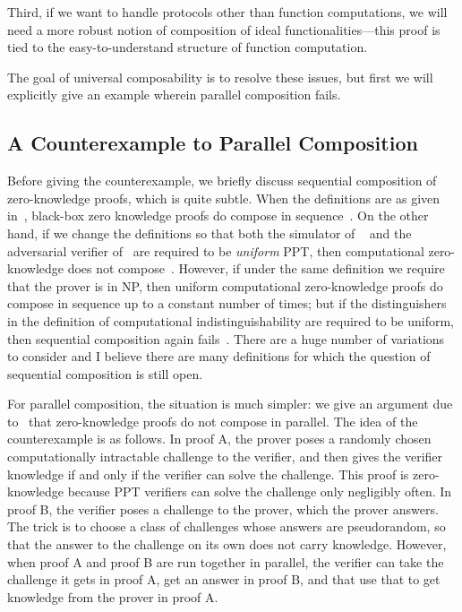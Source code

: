 Third, if we want to handle protocols other than function computations, we will
need a more robust notion of composition of ideal functionalities---this proof
is tied to the easy-to-understand structure of function computation.

The goal of universal composability is to resolve these issues, but first we
will explicitly give an example wherein parallel composition fails.

\subsection{A Counterexample to Parallel Composition}
\label{sec:no-parallel-zk}

Before giving the counterexample, we briefly discuss sequential composition of
zero-knowledge proofs, which is quite subtle. When the definitions are as given
in~, black-box zero
knowledge proofs do compose in sequence~\cite{goldreich-1994}. On the other
hand, if we change the definitions so that both the simulator of
~ and the
adversarial verifier of~
are required to be \emph{uniform} PPT,
then computational zero-knowledge does not
compose~\cite{goldreich-krawczyk-1996}. However, if under the same definition we
require that the prover is in NP, then uniform computational zero-knowledge
proofs do compose in sequence up to a constant number of times; but if the
distinguishers in the definition of computational indistinguishability are
required to be uniform, then sequential composition again fails~\cite{bv-2010}.
There are a huge number of variations to consider and I believe there are many
definitions for which the question of sequential composition is still open.

For parallel composition, the situation is much simpler: we give an argument due
to~\cite{goldreich-krawczyk-1996} that zero-knowledge proofs do not compose in
parallel. The idea of the counterexample is as follows. In proof A, the prover
poses a randomly chosen computationally intractable challenge to the verifier,
and then gives the verifier knowledge if and only if the verifier can solve the
challenge. This proof is zero-knowledge because PPT verifiers can solve the
challenge only negligibly often. In proof B, the verifier poses a challenge to
the prover, which the prover answers. The trick is to choose a class of
challenges whose answers are pseudorandom, so that the answer to the challenge
on its own does not carry knowledge. However, when proof A and proof B are run
together in parallel, the verifier can take the challenge it gets in proof A,
get an answer in proof B, and that use that to get knowledge from the prover in
proof A.

